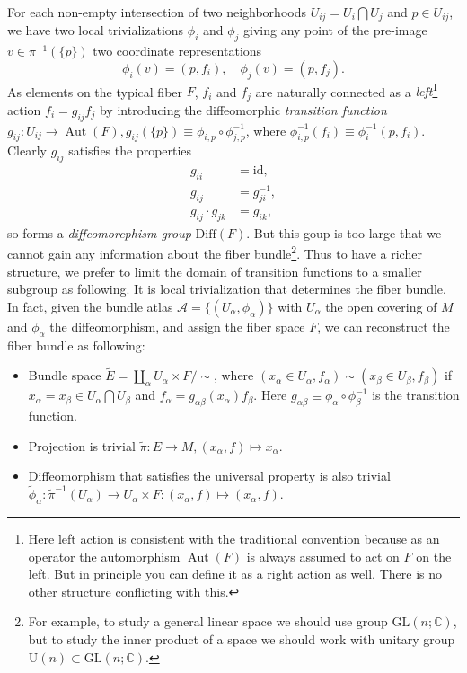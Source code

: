 \documentclass[10pt,nofootinbib,letterpaper]{revtex4}
\newcounter{Note}[section]
\newenvironment{Note}[1][]{{\par\normalfont\bfseries \underline{Note~\stepcounter{Note}\arabic{Note}.}~#1~~}}{\par}
\begin{document}
        For each non-empty intersection of two neighborhoods $U_{ij}=U_i\bigcap U_j$ and $p\in U_{ij}$, we have two local trivializations $\phi_i$ and $\phi_j$ giving any point of the pre-image $v\in\pi^{-1}(\{p\})$ two coordinate representations
        \begin{equation*}
            \phi_i(v)=(p,f_i),\quad \phi_j(v)=(p,f_j).
        \end{equation*}
        As elements on the typical fiber $F$, $f_i$ and $f_j$ are naturally connected as a {\color{red}\emph{left}\footnote{Here left action is consistent with the traditional convention because as an operator the automorphism $\mathop{\mathrm{Aut}}(F)$ is always assumed to act on $F$ on the left. But in principle you can define it as a right action as well. There is no other structure conflicting with this.} action $f_i=g_{ij} f_j$} by introducing the diffeomorphic \emph{transition function} $g_{ij}:U_{ij}\rightarrow\mathop{\mathrm{Aut}}(F), g_{ij}(\{p\})\equiv\phi_{i,p}\circ\phi_{j,p}^{-1}$, where $\phi_{i,p}^{-1}(f_{i})\equiv\phi_{i}^{-1}(p,f_{i})$. Clearly $g_{ij}$ satisfies the properties
        \begin{align*}
            g_{ii}&=\mathrm{id},\\
            g_{ij}&=g_{ji}^{-1},\\
            g_{ij}\cdot g_{jk}&=g_{ik},
        \end{align*}
        so forms a \emph{diffeomorephism group} $\mathrm{Diff}(F)$. But this goup is too large that we cannot gain any information about the fiber bundle\footnote{For example, to study a general linear space we should use group $\mathrm{GL}(n;\mathbb{C})$, but to study the inner product of a space we should work with unitary group $\mathrm{U}(n)\subset\mathrm{GL}(n;\mathbb{C})$.}. Thus to have a richer structure, we prefer to limit the domain of transition functions to a smaller subgroup as following.
        \begin{Note}
            It is local trivialization that determines the fiber bundle. In fact, given the bundle atlas $\mathcal{A}=\{(U_\alpha,\phi_\alpha)\}$ with $U_\alpha$ the open covering of $M$ and $\phi_\alpha$ the diffeomorphism, and assign the fiber space $F$, we can reconstruct the fiber bundle as following:
            \begin{itemize}
                \item Bundle space $\widetilde{E}=\displaystyle\coprod_\alpha U_\alpha\times F/\sim$, where $(x_\alpha\in U_\alpha,f_\alpha)\sim(x_\beta\in U_\beta,f_\beta)$ if $x_\alpha=x_\beta\in U_\alpha\bigcap U_\beta$ and $f_\alpha=g_{\alpha\beta}(x_\alpha)f_\beta$. Here $g_{\alpha\beta}\equiv\phi_\alpha\circ\phi_\beta^{-1}$ is the transition function.
                \item Projection is trivial $\widetilde{\pi}:E\rightarrow M, (x_\alpha,f)\mapsto x_\alpha$.
                \item Diffeomorphism that satisfies the universal property is also trivial $\widetilde{\phi}_\alpha:\widetilde{\pi}^{-1}(U_\alpha)\rightarrow U_\alpha\times F: (x_\alpha,f)\mapsto (x_\alpha,f)$.
            \end{itemize}
        \end{Note}
\end{document}
